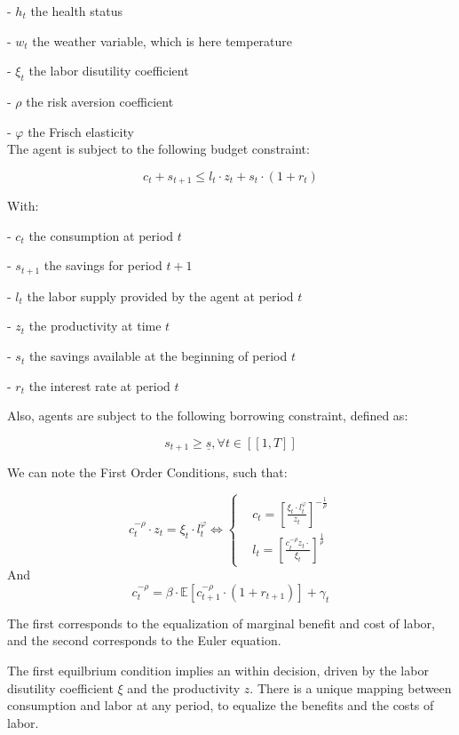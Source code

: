 \documentclass{article}
\begin{document}
-  $h_{t}$  the health status

-  $w_{t}$  the weather variable, which is here temperature

-  $\xi_{t}$ the labor disutility coefficient

- $\rho$ the risk aversion coefficient

- $\varphi$ the Frisch elasticity
\\

The agent is subject to the following budget constraint:

$$c_{t} + s_{t+1} \leq l_{t}\cdot z_{t} + s_{t}\cdot(1+r_{t})$$

With: 

-  $c_t$ the consumption at period $t$

-  $s_{t+1}$ the savings for period $t+1$

-  $l_t$ the labor supply provided by the agent at period $t$

-  $z_t$ the productivity at time $t$

-  $s_{t}$ the savings available at the beginning of period $t$

-  $r_{t}$ the interest rate at period $t$

Also, agents are subject to the following borrowing constraint, defined as: 

$$s_{t+1}\geq \underline{s}, \forall t \in [\![1,T]\!]$$


We can note the First Order Conditions, such that: 

\begin{equation}
    c^{-\rho}_{t}\cdot z_{t} = \xi_{t}\cdot l_{t}^{\varphi} \iff
        \begin{cases}
        & c_t = \left[\frac{\xi_{t}\cdot l_{t}^{\varphi}}{z_{t}}\right]^{-\frac{1}{\rho}}\\ 
        & l_{t} = \left[\frac{c_{t}^{-\rho}z_{t}\cdot}{\xi_{t}}\right]^{\frac{1}{\rho}}
    \end{cases}
\end{equation}
And 
\begin{equation}
    c^{-\rho}_{t} = \beta \cdot \mathbb{E}\left[c^{-\rho}_{t+1}\cdot (1+r_{t+1})\right] + \gamma_{t}
\end{equation}

The first corresponds to the equalization of marginal benefit and
cost of labor, and the second corresponds to the Euler equation.

The first equilbrium condition implies an within decision,
driven by the labor disutility coefficient $\xi$ and the productivity $z$.
There is a unique mapping between consumption and labor at any period, to 
equalize the benefits and the costs of labor.
\end{document}
